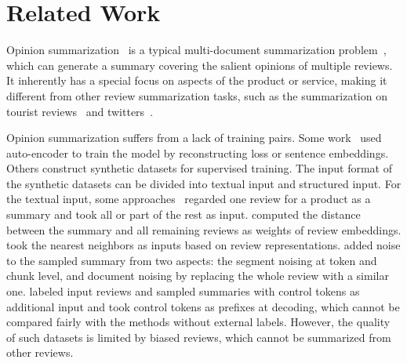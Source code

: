 \section{Related Work}
\label{sec:related}

Opinion summarization~\cite{GeraniMCNN14,rtopi21} is a typical multi-document summarization problem~\cite{abs-2011-04843,FabbriLSLR19,ZajicDL08},
which can generate a summary covering the salient opinions
of multiple reviews. It inherently has a special focus on aspects of the product or service, 
making it different from other review summarization tasks, 
such as the summarization on tourist reviews~\cite{tourist20} and twitters~\cite{DBLP:conf/www/KeswaniC21}.

Opinion summarization suffers from a lack of training pairs. 
Some work~\cite{MeanSum19, Copycat20,tree21} used auto-encoder to train the model by 
reconstructing loss or sentence embeddings. 
Others construct synthetic datasets for supervised training. 
The input format of the synthetic datasets can be divided into 
textual input and structured input.  
For the textual input,
some approaches~\cite{Fewshot20,transsum21}
regarded one review for a product as a summary 
and took all or part of the rest as input. 
\citet{transsum21} computed the distance between the summary and all remaining reviews as weights of review embeddings.
\citet{Plansum20} took the nearest neighbors as inputs based on review representations.
\citet{Denoise20} added noise to the sampled summary from two aspects: the segment noising at token and chunk level, and document noising by replacing the whole review with a similar one. 
\citet{prefix21} labeled input reviews and sampled summaries with control tokens as additional input and took control tokens as prefixes at decoding,
which cannot be compared fairly with the methods without external labels.
However, the quality of such datasets is limited by biased reviews, 
which cannot be summarized from other reviews. 


